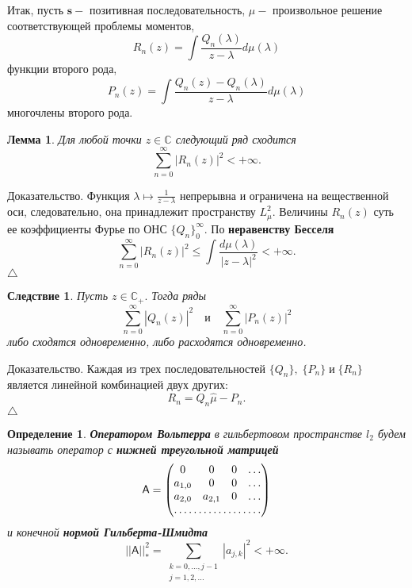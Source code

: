\documentclass[12 pt, a4 paper]{article}
\theoremstyle{plain}   \newtheorem{Pro}{Задача}
\newtheorem{Def}{Определение}
\newtheorem{Cor}{Следствие}
\newtheorem{Lem}{Лемма}
\begin{document}
Итак, пусть
$ \mathbf{s} - $
позитивная последовательность,
$ \mu - $
произвольное решение соответствующей проблемы моментов,
$$
  R_n (z)=\int \frac{Q_n (\lambda )}{z-\lambda}
  d\mu (\lambda )
$$
функции второго рода,
$$
  P_n (z)=\int \frac{Q_n (z)-Q_n (\lambda)}
  {z-\lambda}d\mu (\lambda )
$$
многочлены второго рода.
\begin{Lem}
Для любой точки
$ z \in \mathbb{C} $
следующий ряд сходится
$$
  \sum _{n=0}^{\infty}|R_n (z)|^2 < + \infty .
$$
\end{Lem}
{\Large Доказательство.}
Функция
$ \lambda \mapsto \frac{1}{z-\lambda} $
непрерывна и ограничена на вещественной оси, следовательно,
она принадлежит пространству
$ L_{\mu}^2 . $
Величины
$ R_n (z) $
суть ее коэффициенты Фурье по ОНС
$ \{ Q_n \} _0 ^{\infty} . $
По
{\bfseries неравенству Бесселя}
$$
  \sum _{n=0}^{\infty} |R_n (z)|^2 \leq
  \int \frac{d\mu (\lambda )}{|z-\lambda |^2}
  < + \infty .
$$
$ \triangle $
\begin{Cor}
Пусть
$ z \in \mathbb{C}_+ . $
Тогда ряды
$$
  \sum _{n=0}^{\infty} |Q_n (z)|^2 \quad и \quad
  \sum _{n=0}^{\infty} |P_n (z)|^2
$$
либо сходятся одновременно, либо расходятся одновременно.
\end{Cor}
{\Large Доказательство.}
Каждая из трех последовательностей
$ \{ Q_n \} , \; \{ P_n \} \; и \; \{ R_n \} $
является линейной комбинацией двух других:
$$
  R_n = Q_n \hat \mu - P_n .
$$
$ \triangle $
\begin{Def}
{\bfseries Оператором Вольтерра}
в гильбертовом пространстве
$ l_2 $
будем называть оператор с
{\bfseries нижней треугольной матрицей}
\begin{equation*}
  \mathsf{A}=
    \begin{pmatrix}
	  0 & 0 & 0 & \dots \\
	  a_{1,0} & 0 & 0 & \dots \\
	  a_{2,0} & a_{2,1} & 0 & \dots \\
	  \hdotsfor{4}
	\end{pmatrix}
\end{equation*}
и конечной
{\bfseries нормой Гильберта-Шмидта}
$$
  ||\mathsf{A}||_{\ast}^2 =
  \sum _{\substack{k=0,...,j-1 \\ j=1,2,... }}
  |a_{j,k}|^2 < + \infty .
$$
\end{Def}
\end{document}
